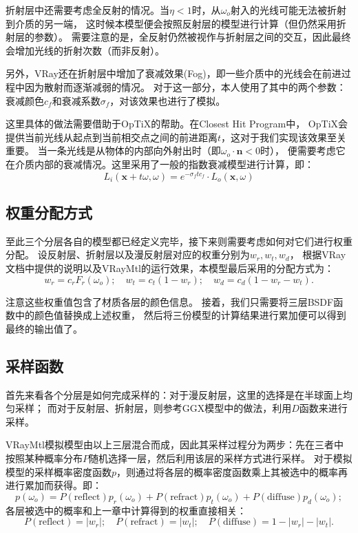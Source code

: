 折射层中还需要考虑全反射的情况。当$\eta<1$时，从$\omega_o$射入的光线可能无法被折射到介质的另一端，
这时候本模型便会按照反射层的模型进行计算（但仍然采用折射层的参数）。
需要注意的是，全反射仍然被视作与折射层之间的交互，因此最终会增加光线的折射次数（而非反射）。

另外，VRay还在折射层中增加了衰减效果(Fog)，即一些介质中的光线会在前进过程中因为散射而逐渐减弱的情况。
对于这一部分，本人使用了其中的两个参数：衰减颜色$c_f$和衰减系数$\sigma_f$，对该效果也进行了模拟。

这里具体的做法需要借助于OpTiX的帮助。在Closest Hit Program中，
OpTiX会提供当前光线从起点到当前相交点之间的前进距离$t$，这对于我们实现该效果至关重要。
当一条光线是从物体的内部向外射出时（即$\omega_o\cdot \textbf{n} < 0$时），
便需要考虑它在介质内部的衰减情况。这里采用了一般的指数衰减模型进行计算，即：
\begin{equation}
   L_i(\textbf{x}+t\omega, \omega) = e^{-\sigma_f t c_f}\cdot L_o(\textbf{x}, \omega) 
\end{equation}

\subsection{权重分配方式}

至此三个分层各自的模型都已经定义完毕，接下来则需要考虑如何对它们进行权重分配。
设反射层、折射层以及漫反射层对应的权重分别为$w_r, w_t, w_d$，
根据VRay文档中提供的说明以及VRayMtl的运行效果，本模型最后采用的分配方式为：
\begin{equation}
w_r = c_rF_r(\omega_o) ; \quad w_t = c_t(1-w_r) ; \quad w_d = c_d(1-w_r-w_t).
\end{equation}

注意这些权重值包含了材质各层的颜色信息。
接着，我们只需要将三层BSDF函数中的颜色值替换成上述权重，
然后将三份模型的计算结果进行累加便可以得到最终的输出值了。

\subsection{采样函数}
\label{VRaySample}
首先来看各个分层是如何完成采样的：对于漫反射层，这里的选择是在半球面上均匀采样；
而对于反射层、折射层，则参考GGX模型中的做法，利用$D$函数来进行采样。

VRayMtl模拟模型由以上三层混合而成，因此其采样过程分为两步：先在三者中按照某种概率分布$P$随机选择一层，然后利用该层的采样方式进行采样。
对于模拟模型的采样概率密度函数$p$，则通过将各层的概率密度函数乘上其被选中的概率再进行累加而获得。即：
\begin{equation}
p(\omega_o) = P(\text{reflect})p_r(\omega_o)+P(\text{refract})p_t(\omega_o)+P(\text{diffuse})p_d(\omega_o);
\end{equation}
各层被选中的概率和上一章中计算得到的权重直接相关：
\begin{equation}
    P(\text{reflect}) = |w_r|; \quad P(\text{refract}) = |w_t|; \quad P(\text{diffuse}) = 1-|w_r|-|w_t|.
\end{equation}
    
